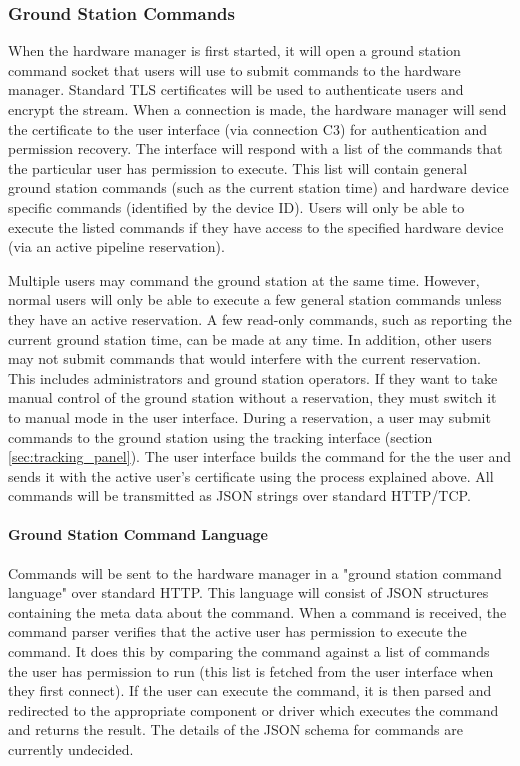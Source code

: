 \documentclass{mxl-design}
\begin{document}
\subsubsection{Ground Station Commands}
\label{sec:connection_c2_commands}
When the hardware manager is first started, it will open a ground station command socket that users will use to submit commands to the hardware manager. Standard TLS certificates will be used to authenticate users and encrypt the stream. When a connection is made, the hardware manager will send the certificate to the user interface (via connection C3) for authentication and permission recovery. The interface will respond with a list of the commands that the particular user has permission to execute. This list will contain general ground station commands (such as the current station time) and hardware device specific commands (identified by the device ID). Users will only be able to execute the listed commands if they have access to the specified hardware device (via an active pipeline reservation). 

Multiple users may command the ground station at the same time. However, normal users will only be able to execute a few general station commands unless they have an active reservation. A few read-only commands, such as reporting the current ground station time, can be made at any time. In addition, other users may not submit commands that would interfere with the current reservation. This includes administrators and ground station operators. If they want to take manual control of the ground station without a reservation, they must switch it to manual mode in the user interface. During a reservation, a user may submit commands to the ground station using the tracking interface (section \ref{sec:tracking_panel}). The user interface builds the command for the the user and sends it with the active user's certificate using the process explained above. All commands will be transmitted as JSON strings over standard HTTP/TCP.

\paragraph{Ground Station Command Language}
Commands will be sent to the hardware manager in a "ground station command language" over standard HTTP. This language will consist of JSON structures containing the meta data about the command. When a command is received, the command parser verifies that the active user has permission to execute the command. It does this by comparing the command against a list of commands the user has permission to run (this list is fetched from the user interface when they first connect). If the user can execute the command, it is then parsed and redirected to the appropriate component or driver which executes the command and returns the result. The details of the JSON schema for commands are currently undecided.
\end{document}
